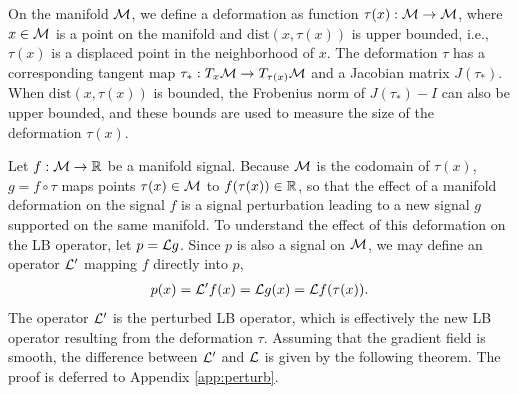
On the manifold ${\mathcal M}$, we define a deformation as function $\tau(x): {\mathcal M} \to {\ensuremath{\mathcal M}}$, where $x \in {\ensuremath{\mathcal M}}$ is a point on the manifold and $\text{dist}(x,\tau(x))$ is upper bounded, i.e., $\tau(x)$ is a displaced point in the neighborhood of $x$. The deformation $\tau$ has a corresponding tangent map $\tau_*: T_x{\mathcal M}\rightarrow T_{\tau(x)}{\mathcal M}$ and a Jacobian matrix $J(\tau_*)$. When $\text{dist}(x,\tau(x))$ is bounded, the Frobenius norm of $J(\tau_*)-I$ can also be upper bounded, and these bounds are used to measure the size of the deformation $\tau(x)$. %

Let $f: {\mathcal M} \to {\mathbb R}$ be a manifold signal. Because ${\mathcal M}$ is the codomain of $\tau(x)$, $g = f \circ \tau$ maps points $\tau(x) \in {\ensuremath{\mathcal M}}$ to $f(\tau(x)) \in {\mathbb R}$, so that
the effect of a manifold deformation on the signal $f$ is a signal perturbation leading to a new signal $g$ supported on the same manifold. To understand the effect of this deformation on the LB operator, let $p = {\mathcal L} g$. Since $p$ is also a signal on ${\mathcal M}$, we may define an operator ${\mathcal L}'$ mapping $f$ directly into $p$,
\begin{align}
\label{eqn:deform}
   p(x) = \ccalL' f(x) = \ccalL g(x) = \ccalL f(\tau(x)).%
\end{align}
The operator ${\mathcal L}'$ is the perturbed LB operator, which is effectively the new LB operator resulting from the deformation $\tau$. Assuming that the gradient field is smooth, the difference between ${\mathcal L}'$ and ${\mathcal L}$ is given by the following theorem. The proof is deferred to Appendix \ref{app:perturb}.

